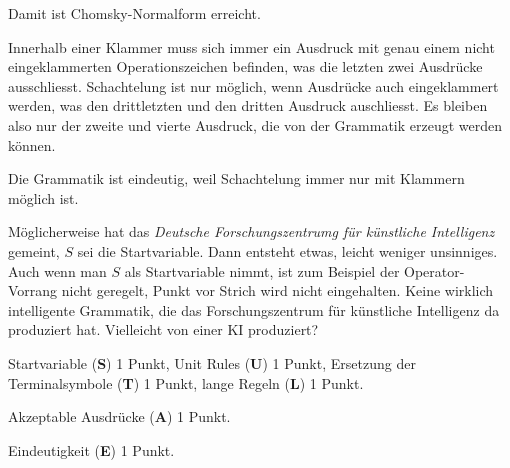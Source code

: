 \begin{loesung}
\begin{teilaufgaben}
Damit ist Chomsky-Normalform erreicht.
\item
Innerhalb einer Klammer muss sich immer ein Ausdruck mit genau einem
nicht eingeklammerten Operationszeichen befinden, was die letzten zwei
Ausdrücke ausschliesst.
Schachtelung ist nur möglich, wenn Ausdrücke auch eingeklammert werden,
was den drittletzten und den dritten Ausdruck auschliesst.
Es bleiben also nur der zweite und vierte Ausdruck, die von der
Grammatik erzeugt werden können.
\item
Die Grammatik ist eindeutig, weil Schachtelung immer nur mit Klammern
möglich ist.
\qedhere
\end{teilaufgaben}
\end{loesung}

\begin{diskussion}
Möglicherweise hat das {\em Deutsche Forschungszentrumg für künstliche
Intelligenz} gemeint, $S$ sei die Startvariable.
Dann entsteht etwas, leicht weniger unsinniges.
Auch wenn man $S$ als Startvariable nimmt, ist zum Beispiel der
Operator-Vorrang nicht geregelt, Punkt vor Strich wird nicht
eingehalten.
Keine wirklich intelligente Grammatik, die das Forschungszentrum
für künstliche Intelligenz da produziert hat.
Vielleicht von einer KI produziert?
\end{diskussion}

\begin{bewertung}
\begin{teilaufgaben}
\item Startvariable ({\bf S}) 1 Punkt,
Unit Rules ({\bf U}) 1 Punkt,
Ersetzung der Terminalsymbole ({\bf T}) 1 Punkt,
lange Regeln ({\bf L}) 1 Punkt.
\item
Akzeptable Ausdrücke ({\bf A}) 1 Punkt.
\item
Eindeutigkeit ({\bf E}) 1 Punkt.
\end{teilaufgaben}
\end{bewertung}




